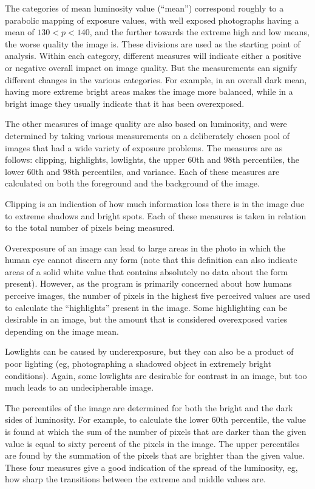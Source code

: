 \documentclass[twocolumn]{article}
\begin{document}
The categories of mean luminosity value (“mean”) correspond roughly to a parabolic mapping of exposure values, with well exposed photographs having a mean of \(130<p<140\), and the further towards the extreme high and low means, the worse quality the image is. These divisions are used as the starting point of analysis. Within each category, different measures will indicate either a positive or negative overall impact on image quality. But the measurements can signify different changes in the various categories. For example, in an overall dark mean, having more extreme bright areas makes the image more balanced, while in a bright image they usually indicate that it has been overexposed.

The other measures of image quality are also based on luminosity, and were determined by taking various measurements on a deliberately chosen pool of images that had a wide variety of exposure problems. The measures are as follows: clipping, highlights, lowlights, the upper 60th and 98th percentiles, the lower 60th and 98th percentiles, and variance. Each of these measures are calculated on both the foreground and the background of the image.

Clipping is an indication of how much information loss there is in the image due to extreme shadows and bright spots. Each of these measures is taken in relation to the total number of pixels being measured.

Overexposure of an image can lead to large areas in the photo in which the human eye cannot discern any form (note that this definition can also indicate areas of a solid white value that contains absolutely no data about the form present). However, as the program is primarily concerned about how humans perceive images, the number of pixels in the highest five perceived values are used to calculate the “highlights” present in the image. Some highlighting can be desirable in an image, but the amount that is considered overexposed varies depending on the image mean.

Lowlights can be caused by underexposure, but they can also be a product of poor lighting (eg, photographing a shadowed object in extremely bright conditions). Again, some lowlights are desirable for contrast in an image, but too much leads to an undecipherable image.

The percentiles of the image are determined for both the bright and the dark sides of luminosity. For example, to calculate the lower 60th percentile, the value is found at which the sum of the number of pixels that are darker than the given value is equal to sixty percent of the pixels in the image. The upper percentiles are found by the summation of the pixels that are brighter than the given value. These four measures give a good indication of the spread of the luminosity, eg, how sharp the transitions between the extreme and middle values are.
\end{document}
